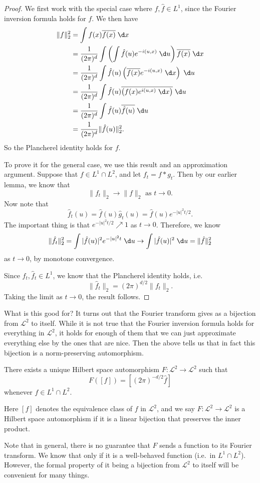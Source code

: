 \documentclass[a4paper]{article}
\begin{document}
\begin{proof}
  We first work with the special case where $f, \hat{f} \in L^1$, since the Fourier inversion formula holds for $f$. We then have
  \begin{align*}
    \|f\|_2^2 &= \int f(x) \overline{f(x)}\;\d x\\
    &= \frac{1}{(2\pi)^d} \int \left(\int \hat{f}(u) e^{-i(u, x)}\;\d u\right)\overline{f(x)}\;\d x\\
    &= \frac{1}{(2\pi)^d} \int \hat{f}(u) \left(\overline{f(x)} e^{-i(u, x)}\;\d x\right) \;\d u\\
    &= \frac{1}{(2\pi)^d} \int \hat{f}(u) \overline{\left(f(x) e^{i(u, x)}\;\d x\right)} \;\d u\\
    &= \frac{1}{(2\pi)^d} \int \hat{f}(u) \overline{\hat{f}(u)} \;\d u\\
    &= \frac{1}{(2\pi)^d} \|\hat{f}(u)\|_2^2.
  \end{align*}
  So the Plancherel identity holds for $f$.

  To prove it for the general case, we use this result and an approximation argument. Suppose that $f \in L^1 \cap L^2$, and let $f_t = f * g_t$. Then by our earlier lemma, we know that
  \[
    \|f_t\|_2 \to \|f\|_2\text{ as }t \to 0.
  \]
  Now note that
  \[
    \hat{f}_t(u) = \hat{f}(u)\hat{g}_t(u) = \hat{f}(u) e^{-|u|^2 t/2}.
  \]
  The important thing is that $e^{-|u|^2 t/2} \nearrow 1$ as $t \to 0$. Therefore, we know
  \[
    \|\hat{f}_t \|_2^2 = \int |\hat{f}(u)|^2 e^{-|u|^2 t}\; \d u \to \int |\hat{f}(u)|^2 \;\d u = \|\hat{f}\|_2^2
  \]
  as $t \to 0$, by monotone convergence.

  Since $f_t, \hat{f}_t \in L^1$, we know that the Plancherel identity holds, i.e.
  \[
    \|\hat{f}_t\|_2 = (2\pi)^{d/2} \|f_t\|_2.
  \]
  Taking the limit as $t \to 0$, the result follows.
\end{proof}

What is this good for? It turns out that the Fourier transform gives as a bijection from $\mathcal{L}^2$ to itself. While it is not true that the Fourier inversion formula holds for everything in $\mathcal{L}^2$, it holds for enough of them that we can just approximate everything else by the ones that are nice. Then the above tells us that in fact this bijection is a norm-preserving automorphism.

\begin{thm}
  There exists a unique Hilbert space automorphism $F: \mathcal{L}^2 \to \mathcal{L}^2$ such that
  \[
    F([f]) = [(2\pi)^{-d/2}\hat{f}]
  \]
  whenever $f \in L^1 \cap L^2$.

  Here $[f]$ denotes the equivalence class of $f$ in $\mathcal{L}^2$, and we say $F: \mathcal{L}^2 \to \mathcal{L}^2$ is a Hilbert space automorphism if it is a linear bijection that preserves the inner product.
\end{thm}
Note that in general, there is no guarantee that $F$ sends a function to its Fourier transform. We know that only if it is a well-behaved function (i.e.\ in $L^1 \cap L^2$). However, the formal property of it being a bijection from $\mathcal{L}^2$ to itself will be convenient for many things.
\end{document}
